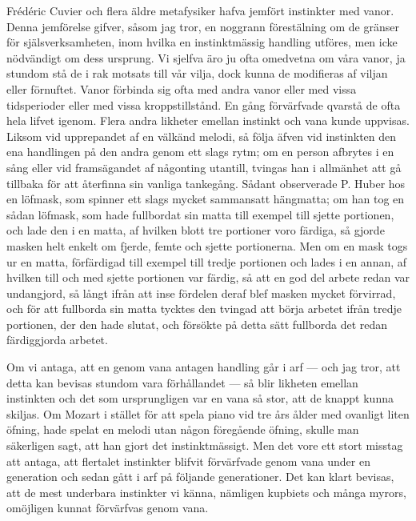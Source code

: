 Frédéric Cuvier och flera äldre metafysiker hafva jemfört instinkter med vanor. Denna jemförelse gifver, såsom jag tror, en noggrann förestälning om de gränser för själsverksamheten, inom hvilka en instinktmässig handling utföres, men icke nödvändigt om dess ursprung. Vi sjelfva äro ju ofta omedvetna om våra vanor, ja stundom stå de i rak motsats till vår vilja, dock kunna de modifieras af viljan eller förnuftet. Vanor förbinda sig ofta med andra vanor eller med vissa tidsperioder eller med vissa kroppstillstånd. En gång förvärfvade qvarstå de ofta hela lifvet igenom. Flera andra likheter emellan instinkt och vana kunde uppvisas. Liksom vid upprepandet af en välkänd melodi, så följa äfven vid instinkten den ena handlingen på den andra genom ett slags rytm; om en person afbrytes i en sång eller vid framsägandet af någonting utantill, tvingas han i allmänhet att gå tillbaka för att återfinna sin vanliga tankegång. Sådant observerade P. Huber hos en löfmask, som spinner ett slags mycket sammansatt hängmatta; om han tog en sådan löfmask, som hade fullbordat sin matta till exempel till sjette portionen, och lade den i en matta, af hvilken blott tre portioner voro färdiga, så gjorde masken helt enkelt om fjerde, femte och sjette portionerna. Men om en mask togs ur en matta, förfärdigad till exempel till tredje portionen och lades i en annan, af hvilken till och med sjette portionen var färdig, så att en god del arbete redan var undangjord, så långt ifrån att inse fördelen deraf blef masken mycket förvirrad, och för att fullborda sin matta tycktes den tvingad att börja arbetet ifrån tredje portionen, der den hade slutat, och försökte på detta sätt fullborda det redan färdiggjorda arbetet.

Om vi antaga, att en genom vana antagen handling går i arf — och jag tror, att detta kan bevisas stundom vara förhållandet — så blir likheten emellan instinkten och det som ursprungligen var en vana så stor, att de knappt kunna skiljas. Om Mozart i stället för att spela piano vid tre års ålder med ovanligt liten öfning, hade spelat en melodi utan någon föregående öfning, skulle man säkerligen sagt, att han gjort det instinktmässigt. Men det vore ett stort misstag att antaga, att flertalet instinkter blifvit förvärfvade genom vana under en generation och sedan gått i arf på följande generationer. Det kan klart bevisas, att de mest underbara instinkter vi känna, nämligen kupbiets och många myrors, omöjligen kunnat förvärfvas genom vana.

